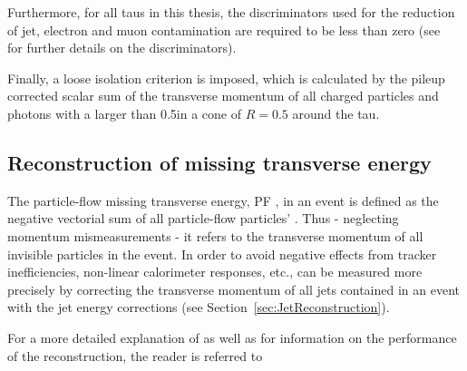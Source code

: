 Furthermore, for all taus in this thesis, the discriminators used for the reduction of jet, electron and muon contamination are required to be less than zero (see~\cite{bib:CMS:TauReconstruction_8TeV} for further details on the discriminators).

Finally, a loose isolation criterion is imposed, which is calculated by the pileup corrected scalar sum of the transverse momentum of all charged particles and photons with a \pt larger than 0.5\gev in a cone of $R=0.5$ around the tau.

\subsection{Reconstruction of missing transverse energy}
The particle-flow missing transverse energy, PF \met, in an event is defined as the negative vectorial sum of all particle-flow particles' \pt.
Thus - neglecting momentum mismeasurements - it refers to the transverse momentum of all invisible particles in the event.
In order to avoid negative effects from \eg tracker inefficiencies, non-linear calorimeter responses, etc., \met can be measured more precisely by correcting the transverse momentum of all jets contained in an event with the jet energy corrections (see Section~\ref{sec:JetReconstruction}).

For a more detailed explanation of \met as well as for information on the performance of the reconstruction, the reader is referred to~\cite{bib:CMS:METReconstruction}

